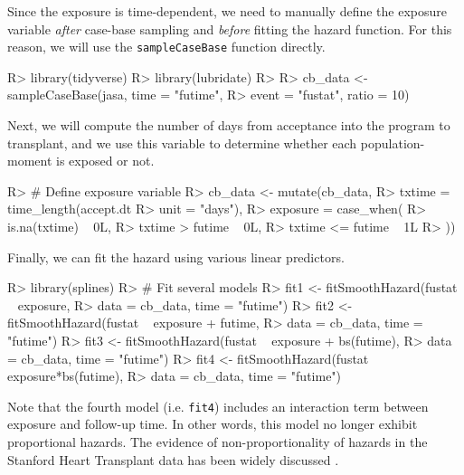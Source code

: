 \documentclass[
]{jss}
\begin{document}
\begin{CodeChunk}
\begin{CodeInput}
Since the exposure is time-dependent, we need to manually define the
exposure variable \emph{after} case-base sampling and \emph{before}
fitting the hazard function. For this reason, we will use the
\texttt{sampleCaseBase} function directly.

\begin{CodeChunk}

\begin{CodeInput}
R> library(tidyverse)
R> library(lubridate)
R> 
R> cb_data <- sampleCaseBase(jasa, time = "futime", 
R>                           event = "fustat", ratio = 10)
\end{CodeInput}
\end{CodeChunk}

Next, we will compute the number of days from acceptance into the
program to transplant, and we use this variable to determine whether
each population-moment is exposed or not.

\begin{CodeChunk}

\begin{CodeInput}
R> # Define exposure variable
R> cb_data <- mutate(cb_data,
R>                   txtime = time_length(accept.dt %
R>                                        unit = "days"),
R>                   exposure = case_when(
R>                     is.na(txtime) ~ 0L,
R>                     txtime > futime ~ 0L,
R>                     txtime <= futime ~ 1L
R>                   ))
\end{CodeInput}
\end{CodeChunk}

Finally, we can fit the hazard using various linear predictors.

\begin{CodeChunk}

\begin{CodeInput}
R> library(splines)
R> # Fit several models
R> fit1 <- fitSmoothHazard(fustat ~ exposure,
R>                         data = cb_data, time = "futime")
R> fit2 <- fitSmoothHazard(fustat ~ exposure + futime,
R>                         data = cb_data, time = "futime")
R> fit3 <- fitSmoothHazard(fustat ~ exposure + bs(futime),
R>                         data = cb_data, time = "futime")
R> fit4 <- fitSmoothHazard(fustat ~ exposure*bs(futime),
R>                         data = cb_data, time = "futime")
\end{CodeInput}
\end{CodeChunk}

Note that the fourth model (i.e. \texttt{fit4}) includes an interaction
term between exposure and follow-up time. In other words, this model no
longer exhibit proportional hazards. The evidence of non-proportionality
of hazards in the Stanford Heart Transplant data has been widely
discussed \citep{arjas1988graphical}.


\end{CodeInput}
\end{CodeChunk}
\end{document}
